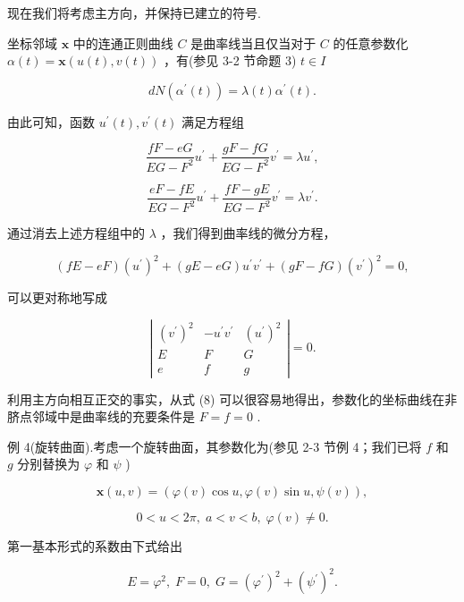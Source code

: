 现在我们将考虑主方向，并保持已建立的符号.

坐标邻域 \(\mathbf{x}\) 中的连通正则曲线 \(C\) 是曲率线当且仅当对于 \(C\) 的任意参数化 \(\alpha \left( t\right)  = \mathbf{x}\left( {u\left( t\right) ,v\left( t\right) }\right)\) ，有(参见 3-2 节命题 3) \(t \in  I\)

\[
{dN}\left( {{\alpha }^{\prime }\left( t\right) }\right)  = \lambda \left( t\right) {\alpha }^{\prime }\left( t\right) .
\]

由此可知，函数 \({u}^{\prime }\left( t\right) ,{v}^{\prime }\left( t\right)\) 满足方程组

\[
\frac{{fF} - {eG}}{{EG} - {F}^{2}}{u}^{\prime } + \frac{{gF} - {fG}}{{EG} - {F}^{2}}{v}^{\prime } = \lambda {u}^{\prime },
\]

\[
\frac{{eF} - {fE}}{{EG} - {F}^{2}}{u}^{\prime } + \frac{{fF} - {gE}}{{EG} - {F}^{2}}{v}^{\prime } = \lambda {v}^{\prime }.
\]

通过消去上述方程组中的 \(\lambda\) ，我们得到曲率线的微分方程，

\[
\left( {{fE} - {eF}}\right) {\left( {u}^{\prime }\right) }^{2} + \left( {{gE} - {eG}}\right) {u}^{\prime }{v}^{\prime } + \left( {{gF} - {fG}}\right) {\left( {v}^{\prime }\right) }^{2} = 0,
\]

可以更对称地写成

\[
\left| \begin{matrix} {\left( {v}^{\prime }\right) }^{2} &  - {u}^{\prime }{v}^{\prime } & {\left( {u}^{\prime }\right) }^{2} \\  E & F & G \\  e & f & g \end{matrix}\right|  = 0. \tag{8}
\]

利用主方向相互正交的事实，从式 (8) 可以很容易地得出，参数化的坐标曲线在非脐点邻域中是曲率线的充要条件是 \(F = f = 0\) .

例 4(旋转曲面).考虑一个旋转曲面，其参数化为(参见 2-3 节例 4；我们已将 \(f\) 和 \(g\) 分别替换为 \(\varphi\) 和 \(\psi\) )

\[
\mathbf{x}\left( {u,v}\right)  = \left( {\varphi \left( v\right) \cos u,\varphi \left( v\right) \sin u,\psi \left( v\right) }\right) ,
\]

\[
0 < u < {2\pi },\;a < v < b,\;\varphi \left( v\right)  \neq  0.
\]

第一基本形式的系数由下式给出

\[
E = {\varphi }^{2},\;F = 0,\;G = {\left( {\varphi }^{\prime }\right) }^{2} + {\left( {\psi }^{\prime }\right) }^{2}.
\]

